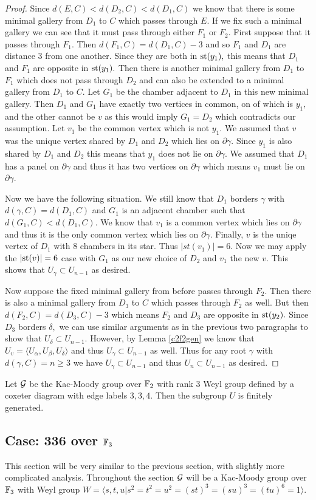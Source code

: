 \documentclass[class=book, crop=false]{standalone}
\begin{document}
\begin{proof}
Since $d(E,C)<d(D_2,C)<d(D_1,C)$ we know that there is some minimal gallery from $D_1$ to $C$ which passes through $E.$ If we fix such a minimal gallery we can see that it must pass through either $F_1$ or $F_2.$ First suppose that it passes through $F_1.$ Then $d(F_1,C)=d(D_1,C)-3$ and so $F_1$ and $D_1$ are distance 3 from one another. Since they are both in $\mathrm{st}(y_1),$ this means that $D_1$ and $F_1$ are opposite in $\mathrm{st}(y_1).$ Then there is another minimal gallery from $D_1$ to $F_1$ which does not pass through $D_2$ and can also be extended to a minimal gallery from $D_1$ to $C.$ Let $G_1$ be the chamber adjacent to $D_1$ in this new minimal gallery. Then $D_1$ and $G_1$ have exactly two vertices in common, on of which is $y_1,$ and the other cannot be $v$ as this would imply $G_1=D_2$ which contradicts our assumption. Let $v_1$ be the common vertex which is not $y_1.$ We assumed that $v$ was the unique vertex shared by $D_1$ and $D_2$ which lies on $\partial \gamma.$ Since $y_1$ is also shared by $D_1$ and $D_2$ this means that $y_1$ does not lie on $\partial \gamma.$ We assumed that $D_1$ has a panel on $\partial \gamma$ and thus it has two vertices on $\partial \gamma$ which means $v_1$ must lie on $\partial \gamma.$

Now we have the following situation. We still know that $D_1$ borders $\gamma$ with $d(\gamma,C)=d(D_1,C)$ and $G_1$ is an adjacent chamber such that $d(G_1,C)<d(D_1,C).$ We know that $v_1$ is a common vertex which lies on $\partial\gamma$ and thus it is the only common vertex which lies on $\partial\gamma.$ Finally, $v$ is the uniqe vertex of $D_1$ with 8 chambers in its star. Thus $|st(v_1)|=6.$ Now we may apply the $|\mathrm{st}(v)|=6$ case with $G_1$ as our new choice of $D_2$ and $v_1$ the new $v.$ This shows that $U_\gamma\subset U_{n-1}$ as desired.

Now suppose the fixed minimal gallery from before passes through $F_2.$ Then there is also a minimal gallery from $D_3$ to $C$ which passes through $F_2$ as well. But then $d(F_2,C)=d(D_3,C)-3$ which means $F_2$ and $D_3$ are opposite in $\mathrm{st}(y_2).$ Since $D_3$ borders $\delta,$ we can use similar arguments as in the previous two paragraphs to show that $U_\delta\subset U_{n-1}.$ However, by Lemma \ref{c2f2gen} we know that $U_v=\langle U_\alpha,U_\beta,U_\delta\rangle$ and thus $U_\gamma\subset U_{n-1}$ as well. Thus for any root $\gamma$ with $d(\gamma,C)=n\ge 3$ we have $U_\gamma\subset U_{n-1}$ and thus $U_n\subset U_{n-1}$ as desired.
\end{proof}

\begin{cor}
	Let $\mathcal{G}$ be the Kac-Moody group over $\mathbb{F}_{2}$ with rank 3 Weyl group defined by a coxeter diagram with edge labels $3,3,4.$ Then the subgroup $U$ is finitely generated.
\end{cor}

\subsection{Case: 336 over $\mathbb{F}_{3}$}
This section will be very similar to the previous section, with slightly more complicated analysis. Throughout the section $\mathcal{G}$ will be a Kac-Moody group over $\mathbb{F}_{3}$ with Weyl group $W=\langle s,t,u|s^2=t^2=u^2=(st)^3=(su)^3=(tu)^6=1\rangle.$ 
\end{document}
